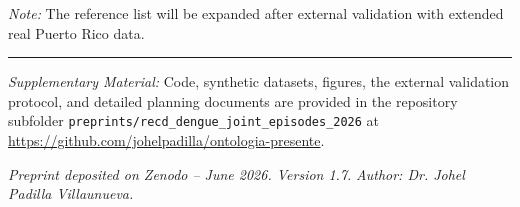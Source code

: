 \documentclass[11pt,a4paper]{article}
\begin{document}
\noindent\textit{Note:} The reference list will be expanded after external validation with extended real Puerto Rico data.

\vspace{0.6em}
\hrule
\vspace{0.5em}
\begin{sloppypar}
\noindent\textit{Supplementary Material:} Code, synthetic datasets, figures, the external validation protocol, and detailed planning documents are provided in the repository subfolder \texttt{preprints/recd\_dengue\_joint\_episodes\_2026} at \url{https://github.com/johelpadilla/ontologia-presente}.
\end{sloppypar}

\vspace{0.6em}
\noindent\textit{Preprint deposited on Zenodo – June 2026. Version 1.7.}  
\noindent\textit{Author: Dr. Johel Padilla Villaunueva.}
\end{document}
